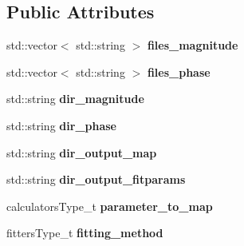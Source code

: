 \subsection*{Public Attributes}
\begin{DoxyCompactItemize}
\item 
\hypertarget{struct_ox_1_1_ox_shmolli2_options_a155f1275666929d63ad9db47591f9862}{std\-::vector$<$ std\-::string $>$ {\bfseries files\-\_\-magnitude}}\label{struct_ox_1_1_ox_shmolli2_options_a155f1275666929d63ad9db47591f9862}

\item 
\hypertarget{struct_ox_1_1_ox_shmolli2_options_ac328dac5b21b702d44b1ba0e05cd0ccb}{std\-::vector$<$ std\-::string $>$ {\bfseries files\-\_\-phase}}\label{struct_ox_1_1_ox_shmolli2_options_ac328dac5b21b702d44b1ba0e05cd0ccb}

\item 
\hypertarget{struct_ox_1_1_ox_shmolli2_options_ae99838cef6ecded69fb6527d1e8442fa}{std\-::string {\bfseries dir\-\_\-magnitude}}\label{struct_ox_1_1_ox_shmolli2_options_ae99838cef6ecded69fb6527d1e8442fa}

\item 
\hypertarget{struct_ox_1_1_ox_shmolli2_options_a956a40ac6d84fdf48865921e40099b78}{std\-::string {\bfseries dir\-\_\-phase}}\label{struct_ox_1_1_ox_shmolli2_options_a956a40ac6d84fdf48865921e40099b78}

\item 
\hypertarget{struct_ox_1_1_ox_shmolli2_options_af3eb96fd8f7aa6a27e060b9bb8e051e6}{std\-::string {\bfseries dir\-\_\-output\-\_\-map}}\label{struct_ox_1_1_ox_shmolli2_options_af3eb96fd8f7aa6a27e060b9bb8e051e6}

\item 
\hypertarget{struct_ox_1_1_ox_shmolli2_options_a76cadb9f2de4953b37f7346adc0783c5}{std\-::string {\bfseries dir\-\_\-output\-\_\-fitparams}}\label{struct_ox_1_1_ox_shmolli2_options_a76cadb9f2de4953b37f7346adc0783c5}

\item 
\hypertarget{struct_ox_1_1_ox_shmolli2_options_a6266e4931bf30cac5ebe7496b1f26cf2}{calculators\-Type\-\_\-t {\bfseries parameter\-\_\-to\-\_\-map}}\label{struct_ox_1_1_ox_shmolli2_options_a6266e4931bf30cac5ebe7496b1f26cf2}

\item 
\hypertarget{struct_ox_1_1_ox_shmolli2_options_a30c521714b0a6f670db0497c06ebcce6}{fitters\-Type\-\_\-t {\bfseries fitting\-\_\-method}}\label{struct_ox_1_1_ox_shmolli2_options_a30c521714b0a6f670db0497c06ebcce6}


\end{DoxyCompactItemize}
